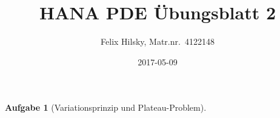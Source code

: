 \documentclass{scrartcl}
\author{Felix Hilsky, Matr.nr.\ 4122148}
\title{HANA PDE Übungsblatt 2}
\date{2017-05-09}
\newtheorem {problem} {Aufgabe}
\begin{document}
  \maketitle

  \begin{problem}[Variationsprinzip und Plateau-Problem]
    


\end{problem}
\end{document}

